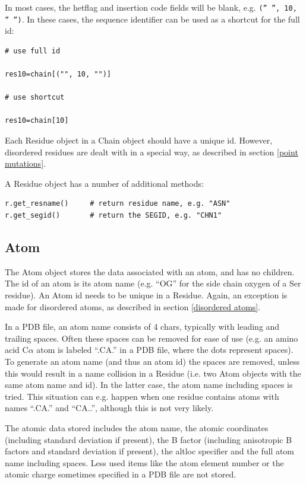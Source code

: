 \documentclass{report}
\begin{document}
In most cases, the hetflag and insertion code fields will be blank, e.g. {\tt ('' '', 10, '' '')}.
In these cases, the sequence identifier can be used as a shortcut for the full
id:

\begin{verbatim}
# use full id

res10=chain[("", 10, "")]

# use shortcut

res10=chain[10]
\end{verbatim}

Each Residue object in a Chain object should have a unique id. However, disordered
residues are dealt with in a special way, as described in section \ref{point mutations}.

A Residue object has a number of additional methods:

\begin{verbatim}
r.get_resname()		# return residue name, e.g. "ASN"
r.get_segid()		# return the SEGID, e.g. "CHN1"
\end{verbatim}

\subsection{Atom}

The Atom object stores the data associated with an atom, and has no children.
The id of an atom is its atom name (e.g. {}``OG{}'' for the side chain oxygen
of a Ser residue). An Atom id needs to be unique in a Residue. Again, an exception
is made for disordered atoms, as described in section \ref{disordered atoms}.

In a PDB file, an atom name consists of 4 chars, typically with leading and
trailing spaces. Often these spaces can be removed for ease of use (e.g. an
amino acid C\( \alpha  \) atom is labeled {}``.CA.{}'' in a PDB file, where
the dots represent spaces). To generate an atom name (and thus an atom id) the
spaces are removed, unless this would result in a name collision in a Residue
(i.e. two Atom objects with the same atom name and id). In the latter case,
the atom name including spaces is tried. This situation can e.g. happen when
one residue contains atoms with names {}``.CA.{}'' and {}``CA..{}'', although
this is not very likely.

The atomic data stored includes the atom name, the atomic coordinates (including
standard deviation if present), the B factor (including anisotropic B factors
and standard deviation if present), the altloc specifier and the full atom name
including spaces. Less used items like the atom element number or the atomic
charge sometimes specified in a PDB file are not stored.
\end{document}
